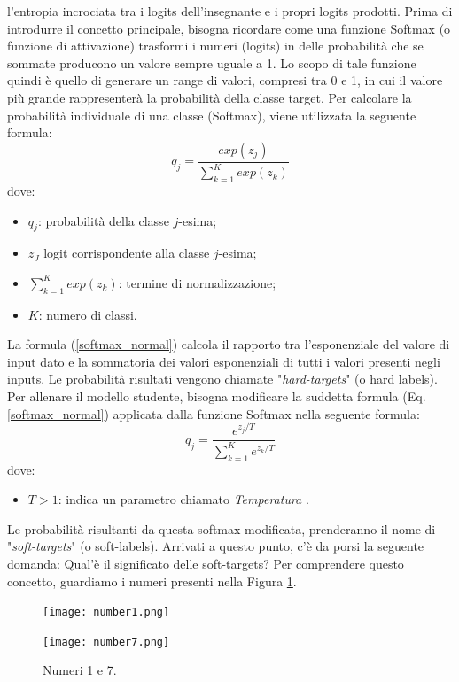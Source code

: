 l'entropia incrociata tra i logits dell'insegnante e i propri logits prodotti. 
Prima di introdurre il concetto principale, bisogna ricordare come una 
funzione Softmax (o funzione di attivazione) trasformi i numeri (logits) in 
delle probabilità che se sommate producono un valore sempre uguale a 1.  
Lo scopo di tale funzione quindi è quello di generare un range di valori, 
compresi tra 0 e 1, in cui il valore più grande rappresenterà la probabilità 
della classe target. Per calcolare la probabilità individuale di una classe 
(Softmax), viene utilizzata la seguente formula:
\begin{equation}\label{softmax_normal}
    q_j = \frac{exp(z_j)}{\sum_{k=1}^K exp(z_k)}
\end{equation}
dove:
\begin{itemize}
    \item $q_j$: probabilità della classe $j$-esima;
    \item $z_J$ logit corrispondente alla classe $j$-esima;
    \item $\sum_{k=1}^K exp(z_k)$: termine di normalizzazione;
    \item $K$: numero di classi.
\end{itemize}
La formula (\ref{softmax_normal}) calcola il rapporto tra l'esponenziale del valore di input 
dato e la sommatoria dei valori esponenziali di tutti i valori presenti negli 
inputs. Le probabilità risultati vengono chiamate "\emph{hard-targets}" (o hard 
labels). Per allenare il modello studente, bisogna modificare la suddetta 
formula (Eq. \ref{softmax_normal}) applicata dalla funzione Softmax nella seguente formula:
\begin{equation}
    q_j = \frac{e^{z_j/T}}{\sum_{k=1}^K e^{z_k/T}}
\end{equation}
dove:
\begin{itemize}
    \item $T>1$: indica un parametro chiamato \emph{Temperatura} \cite{marino2021compact}.
\end{itemize}
Le probabilità risultanti da questa softmax modificata, prenderanno il nome 
di "\emph{soft-targets}" (o soft-labels). Arrivati a questo punto, c'è da porsi la 
seguente domanda: Qual'è il significato delle soft-targets? Per comprendere 
questo concetto, guardiamo i numeri presenti nella Figura \ref{numbers_Mnist}.
\begin{figure}[]
    \begin{minipage}[t]{.45\textwidth}
        \centering
        \texttt{[image: number1.png]}
    \end{minipage}
    \hfill
    \begin{minipage}[t]{.45\textwidth}
        \centering
        \texttt{[image: number7.png]}
    \end{minipage}  
    \caption{Numeri 1 e 7.}
    \label{numbers_Mnist}
\end{figure}
